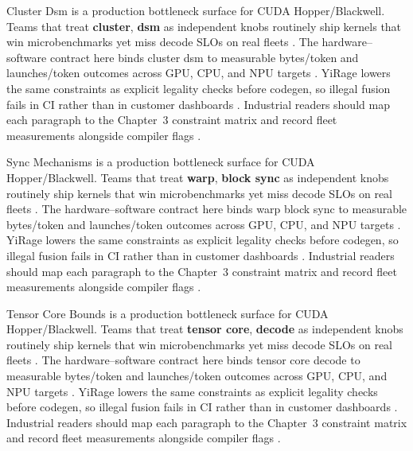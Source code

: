 Cluster Dsm is a production bottleneck surface for CUDA Hopper/Blackwell. Teams that treat \textbf{cluster}, \textbf{dsm} as independent knobs routinely ship kernels that win microbenchmarks yet miss decode SLOs on real fleets \citep{amd2024aie,kwon2023vllm}. The hardware--software contract here binds cluster dsm to measurable bytes/token and launches/token outcomes across GPU, CPU, and NPU targets \citep{dlbook,nvidia2024cudagraphs}. YiRage lowers the same constraints as explicit legality checks before codegen, so illegal fusion fails in CI rather than in customer dashboards \citep{dao2022flashattention,liu2024deepseekv3}. Industrial readers should map each paragraph to the Chapter~3 constraint matrix and record fleet measurements alongside compiler flags \citep{kwon2023vllm,patel2025llminference}.

Sync Mechanisms is a production bottleneck surface for CUDA Hopper/Blackwell. Teams that treat \textbf{warp}, \textbf{block sync} as independent knobs routinely ship kernels that win microbenchmarks yet miss decode SLOs on real fleets \citep{dlbook,nvidia2024cudagraphs}. The hardware--software contract here binds warp block sync to measurable bytes/token and launches/token outcomes across GPU, CPU, and NPU targets \citep{dao2022flashattention,liu2024deepseekv3}. YiRage lowers the same constraints as explicit legality checks before codegen, so illegal fusion fails in CI rather than in customer dashboards \citep{kwon2023vllm,patel2025llminference}. Industrial readers should map each paragraph to the Chapter~3 constraint matrix and record fleet measurements alongside compiler flags \citep{nvidia2024cudagraphs,taxbreak2026}.

Tensor Core Bounds is a production bottleneck surface for CUDA Hopper/Blackwell. Teams that treat \textbf{tensor core}, \textbf{decode} as independent knobs routinely ship kernels that win microbenchmarks yet miss decode SLOs on real fleets \citep{dao2022flashattention,liu2024deepseekv3}. The hardware--software contract here binds tensor core decode to measurable bytes/token and launches/token outcomes across GPU, CPU, and NPU targets \citep{kwon2023vllm,patel2025llminference}. YiRage lowers the same constraints as explicit legality checks before codegen, so illegal fusion fails in CI rather than in customer dashboards \citep{nvidia2024cudagraphs,taxbreak2026}. Industrial readers should map each paragraph to the Chapter~3 constraint matrix and record fleet measurements alongside compiler flags \citep{liu2024deepseekv3,memoryfloor2026}.

